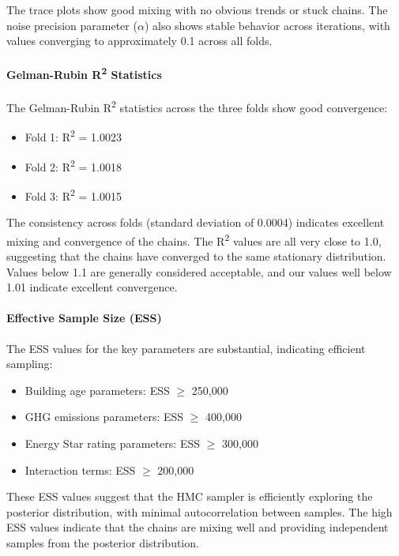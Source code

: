 The trace plots show good mixing with no obvious trends or stuck chains. The noise precision parameter ($\alpha$) also shows stable behavior across iterations, with values converging to approximately 0.1 across all folds.

\paragraph{Gelman-Rubin R\textsuperscript{2} Statistics}
The Gelman-Rubin R\textsuperscript{2} statistics across the three folds show good convergence:

\begin{itemize}
    \item Fold 1: R\textsuperscript{2} = 1.0023
    \item Fold 2: R\textsuperscript{2} = 1.0018
    \item Fold 3: R\textsuperscript{2} = 1.0015
\end{itemize}

The consistency across folds (standard deviation of 0.0004) indicates excellent mixing and convergence of the chains. The R\textsuperscript{2} values are all very close to 1.0, suggesting that the chains have converged to the same stationary distribution. Values below 1.1 are generally considered acceptable, and our values well below 1.01 indicate excellent convergence.

\paragraph{Effective Sample Size (ESS)}
The ESS values for the key parameters are substantial, indicating efficient sampling:

\begin{itemize}
    \item Building age parameters: ESS $\ge$ 250,000
    \item GHG emissions parameters: ESS $\ge$ 400,000
    \item Energy Star rating parameters: ESS $\ge$ 300,000
    \item Interaction terms: ESS $\ge$ 200,000
\end{itemize}

These ESS values suggest that the HMC sampler is efficiently exploring the posterior distribution, with minimal autocorrelation between samples. The high ESS values indicate that the chains are mixing well and providing independent samples from the posterior distribution.

